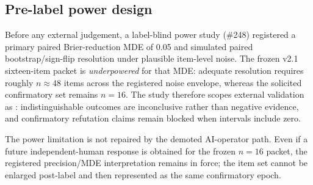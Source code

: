 \subsection{Pre-label power design}

Before any external judgement, a label-blind power study (\#248) registered a
primary paired Brier-reduction MDE of 0.05 and simulated paired bootstrap/sign-flip
resolution under plausible item-level noise. The frozen v2.1 sixteen-item packet
is \emph{underpowered} for that MDE: adequate resolution requires roughly
$n\approx 48$ items across the registered noise envelope, whereas the solicited
confirmatory set remains $n=16$. The study therefore scopes external validation as
: indistinguishable outcomes are
inconclusive rather than negative evidence, and confirmatory refutation claims
remain blocked when intervals include zero.

The power limitation is not repaired by the demoted AI-operator path. Even if a
future independent-human response is obtained for the frozen $n=16$ packet, the
registered precision/MDE interpretation remains in force; the item set cannot be
enlarged post-label and then represented as the same confirmatory epoch.
